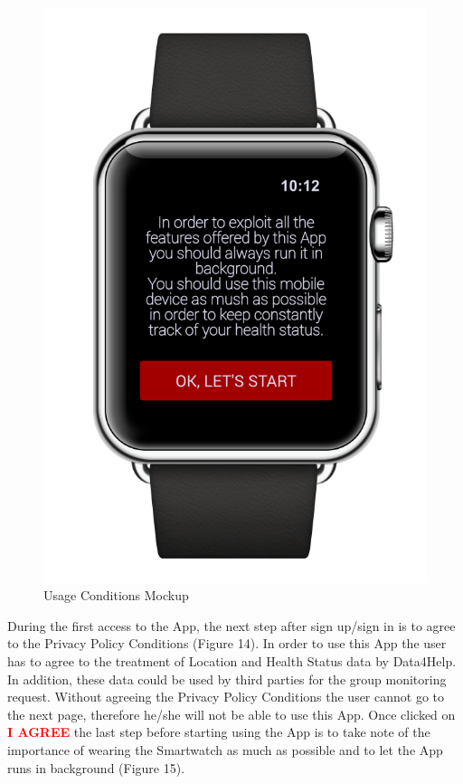 \begin{enumerate}
\begin{figure}[H]
\begin{center}
\begin{minipage}[c]{.40\textwidth}
          \includegraphics[height=12 cm]{Images/Mockups/AutomatedSOSMockup4.png}
          \vspace{0.1cm}
          	\caption{Usage Conditions Mockup}
        \end{minipage}
      \end{center}
\end{figure}
During the first access to the App, the next step after sign up/sign in is to agree to the Privacy Policy Conditions (Figure 14). In order to use this App the user has to agree to the treatment of Location and Health Status data by Data4Help. In addition, these data could be used by third parties for the group monitoring request. Without agreeing the Privacy Policy Conditions the user cannot go to the next page, therefore he/she will not be able to use this App. Once clicked on {\textcolor{Red}{\textbf{I AGREE}}} the last step before starting using the App is to take note of the importance of wearing the Smartwatch as much as possible and to let the App runs in background (Figure 15).
\clearpage
\begin{figure}
\begin{center}
	\bigbreak
        \begin{minipage}[c]{.40\textwidth}
        \centering

\end{minipage}
\end{center}
\end{figure}
\end{enumerate}
